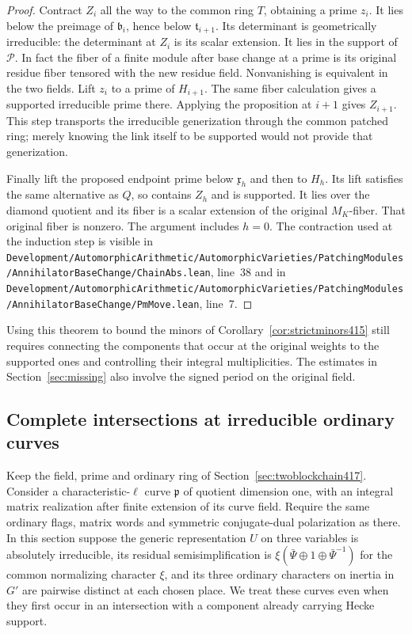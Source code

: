 \documentclass[a4paper,11pt]{article}
\theoremstyle{definition}
\theoremstyle{remark}
\newcommand{\srcloc}[2]{{\small\nolinkurl{#1.lean}}, line~#2}
\numberwithin{equation}{section}
\begin{document}
\begin{proof}
Contract \(Z_i\) all the way to the common ring \(T\), obtaining
a prime \(z_i\). It lies below the preimage of \(\mathfrak b_i\),
hence below \(\mathfrak t_{i+1}\). Its determinant is
geometrically irreducible: the determinant at \(Z_i\) is its
scalar extension. It lies in the support of \(\mathcal P\).
In fact the fiber of a finite module after base change at
a prime is its original residue fiber tensored with the
new residue field. Nonvanishing is equivalent in the two
fields. Lift \(z_i\) to a prime of \(H_{i+1}\). The same
fiber calculation gives a supported irreducible prime
there. Applying the proposition at \(i+1\) gives \(Z_{i+1}\).
This step transports the irreducible generization through
the common patched ring; merely knowing the link itself to
be supported would not provide that generization.

Finally lift the proposed endpoint prime below \(\mathfrak x_h\)
and then to \(H_h\). Its lift satisfies the same alternative
as \(Q\), so contains \(Z_h\) and is supported. It lies over
the diamond quotient and its fiber is a scalar extension of
the original \(M_K\)-fiber. That original fiber is nonzero.
The argument includes \(h=0\). The contraction used at the
induction step is visible in
\srcloc{Development/AutomorphicArithmetic/AutomorphicVarieties/PatchingModules/AnnihilatorBaseChange/ChainAbs}{38}
and in
\srcloc{Development/AutomorphicArithmetic/AutomorphicVarieties/PatchingModules/AnnihilatorBaseChange/PmMove}{7}.
\end{proof}

Using this theorem to bound the minors of
Corollary~\ref{cor:strictminors415} still requires connecting
the components that occur at the original weights to the
supported ones and controlling their integral multiplicities.
The estimates in Section~\ref{sec:missing} also involve the
signed period on the original field.


\subsection{Complete intersections at irreducible ordinary curves}
\label{sec:irreduciblechain418}

Keep the field, prime and ordinary ring of
Section~\ref{sec:twoblockchain417}. Consider a characteristic-\(\ell\)
curve \(\mathfrak p\) of quotient dimension one, with an integral
matrix realization after finite extension of its curve field.
Require the same ordinary flags, matrix words and symmetric
conjugate-dual polarization as there. In this section suppose
the generic representation \(U\) on three variables is absolutely
irreducible, its residual semisimplification is
\(\xi(\bar\Psi\oplus1\oplus\bar\Psi^{-1})\) for the common
normalizing character \(\xi\), and its three ordinary characters
on inertia in \(G'\) are pairwise distinct at each chosen place.
We treat these curves even when they first occur in an
intersection with a component already carrying Hecke support.
\end{document}
